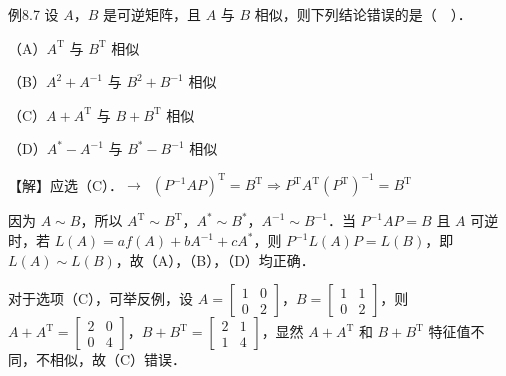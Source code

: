 
\begin{fcard}{例8.7}
设 $A$，$B$ 是可逆矩阵，且 $A$ 与 $B$ 相似，则下列结论错误的是（$\quad$）．

（A）$A^{\mathrm T}$ 与 $B^{\mathrm T}$ 相似

（B）$A^2+A^{-1}$ 与 $B^2+B^{-1}$ 相似

（C）$A+A^{\mathrm T}$ 与 $B+B^{\mathrm T}$ 相似

（D）$A^{*}-A^{-1}$ 与 $B^{*}-B^{-1}$ 相似

【解】应选（C）．\quad$\to$\ $(P^{-1}AP)^{\mathrm T}=B^{\mathrm T}\Rightarrow P^{\mathrm T}A^{\mathrm T}(P^{\mathrm T})^{-1}=B^{\mathrm T}$


因为 $A\sim B$，所以 $A^{\mathrm T}\sim B^{\mathrm T}$，$A^{*}\sim B^{*}$，$A^{-1}\sim B^{-1}$．当 $P^{-1}AP=B$ 且 $A$ 可逆时，若 $L(A)=af(A)+bA^{-1}+cA^{*}$，则 $P^{-1}L(A)P=L(B)$，即 $L(A)\sim L(B)$，故（A），（B），（D）均正确．

对于选项（C），可举反例，设 $A=\begin{bmatrix}1&0\\0&2\end{bmatrix}$，$B=\begin{bmatrix}1&1\\0&2\end{bmatrix}$，则 $A+A^{\mathrm T}=\begin{bmatrix}2&0\\0&4\end{bmatrix}$，$B+B^{\mathrm T}=\begin{bmatrix}2&1\\1&4\end{bmatrix}$，显然 $A+A^{\mathrm T}$ 和 $B+B^{\mathrm T}$ 特征值不同，不相似，故（C）错误．
\end{fcard}



